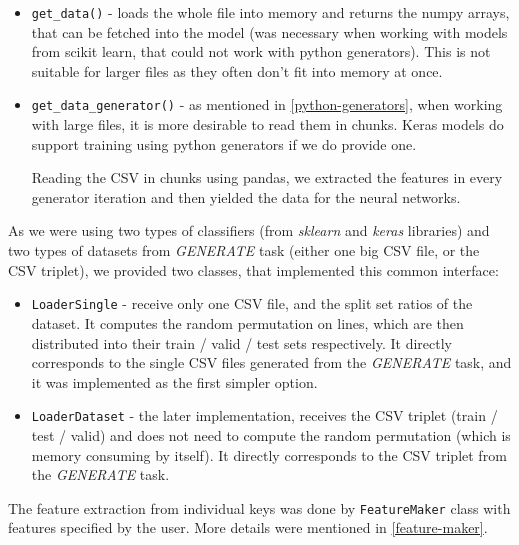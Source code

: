 \begin{itemize}

\item \texttt{get\_data()} - loads the whole file into memory and returns the numpy arrays, that can be fetched into the model (was necessary when working with models from scikit learn, that could not work with python generators). This is not suitable for larger files as they often don't fit into memory at once.

\item \texttt{get\_data\_generator()} - as mentioned in \autoref{python-generators}, when working with large files, it is more desirable to read them in chunks. Keras models do support training using python generators if we do provide one.

Reading the CSV in chunks using pandas, we extracted the features in every generator iteration and then yielded the data for the neural networks.

\end{itemize}

\noindent
As we were using two types of classifiers (from \textit{sklearn} and \textit{keras} libraries) and two types of datasets from \textit{GENERATE} task (either one big CSV file, or the CSV triplet), we provided two classes, that implemented this common interface:

\begin{itemize}

\item \texttt{LoaderSingle} - receive only one CSV file, and the split set ratios of the dataset. It computes the random permutation on lines, which are then distributed into their train / valid / test sets respectively. It directly corresponds to the single CSV files generated from the \textit{GENERATE} task, and it was implemented as the first simpler option.

\item \texttt{LoaderDataset} - the later implementation, receives the CSV triplet (train / test / valid) and does not need to compute the random permutation (which is memory consuming by itself). It directly corresponds to the CSV triplet from the \textit{GENERATE} task.

\end{itemize}

\noindent
The feature extraction from individual keys was done by \texttt{FeatureMaker} class with features specified by the user. More details were mentioned in \autoref{feature-maker}.

